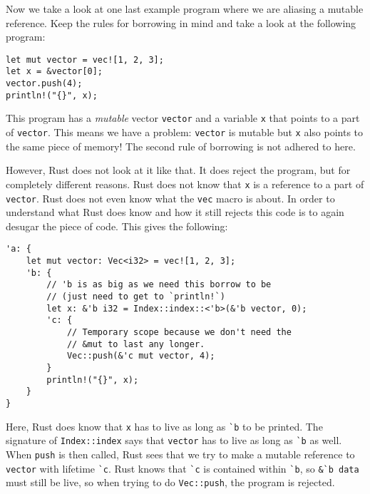 Now we take a look at one last example program where we are aliasing a mutable reference. Keep the rules for borrowing in mind and take a look at the following program:

\begin{verbatim}
let mut vector = vec![1, 2, 3];
let x = &vector[0];
vector.push(4);
println!("{}", x);
\end{verbatim}

This program has a \textit{mutable} vector \texttt{vector} and a variable \texttt{x} that points to a part of \texttt{vector}. This means we have a problem:  \texttt{vector} is mutable but \texttt{x} also points to the same piece of memory! The second rule of borrowing is not adhered to here. 

However, Rust does not look at it like that. It does reject the program, but for completely different reasons. Rust does not know that \texttt{x} is a reference to a part of \texttt{vector}. Rust does not even know what the \texttt{vec} macro is about. In order to understand what Rust does know and how it still rejects this code is to again desugar the piece of code. This gives the following: 

\begin{verbatim}
'a: {
    let mut vector: Vec<i32> = vec![1, 2, 3];
    'b: {
        // 'b is as big as we need this borrow to be
        // (just need to get to `println!`)
        let x: &'b i32 = Index::index::<'b>(&'b vector, 0);
        'c: {
            // Temporary scope because we don't need the
            // &mut to last any longer.
            Vec::push(&'c mut vector, 4);
        }
        println!("{}", x);
    }
}
\end{verbatim}

Here, Rust does know that \verb|x| has to live as long as \verb|`b| to be printed. The signature of \verb|Index::index| says that \verb|vector| has to live as long as \verb|`b| as well. When \verb|push| is then called, Rust sees that we try to make a mutable reference to \verb|vector| with lifetime \verb|`c|. Rust knows that \verb|`c| is contained within \verb|`b|, so \verb|&`b data| must still be live, so when trying to do \verb|Vec::push|, the program is rejected. 
